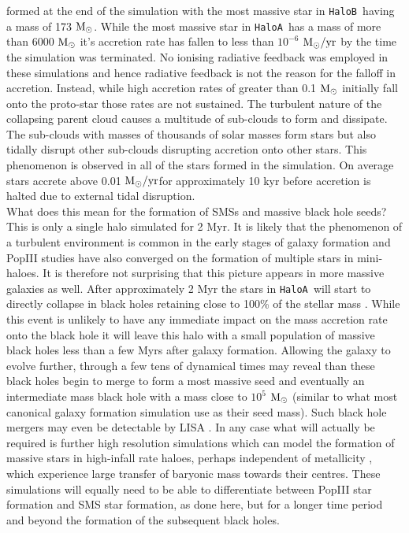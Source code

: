 \documentclass[graphics, twocolumn, usenatbib]{mn2e}
\newcommand{\msolar} {$\rm{M_{\odot}}~$}
\newcommand{\msolarc} {$\rm{M_{\odot}}$}
\newcommand{\msolaryr} {$\rm{M_{\odot}/yr}~$}
\newcommand{\msolaryrc} {$\rm{M_{\odot}/yr}$}
\newcommand{\ha} {\texttt{HaloA~}}
\newcommand{\hb} {\texttt{HaloB~}}
\begin{document}
formed at the end of the simulation with the most massive star in \hb having a mass of 173 \msolarc.
While the most massive star in \ha has a mass of more than 6000 \msolar it's accretion rate has fallen
to less than $10^{-6}$ \msolaryr by the time the simulation was terminated. No ionising radiative
feedback was employed in these simulations and hence radiative feedback is not the reason for
the falloff in accretion. Instead, while high accretion rates of greater than 0.1 \msolar initially
fall onto the proto-star those rates are not sustained. The turbulent nature of the collapsing parent
cloud causes a multitude of sub-clouds to form and dissipate. The sub-clouds with masses of
thousands of solar masses form stars but also tidally disrupt other sub-clouds disrupting
accretion onto other stars. This phenomenon is observed in all of the stars formed in the simulation.
On average stars accrete above 0.01 \msolaryrc for approximately 10 kyr before accretion is halted
due to external tidal disruption. \\
\indent What does this mean for the formation of SMSs and massive black hole seeds? This is only a
single halo simulated for 2 Myr. It is likely that the phenomenon of a turbulent environment is
common in the early stages of galaxy formation and PopIII studies have also converged on the
formation of multiple stars in mini-haloes. It is therefore not surprising that this picture appears in
more massive galaxies as well. After approximately 2 Myr the stars in \ha will start to directly
collapse in black holes retaining close to 100\% of the stellar mass \citep{Heger_2003}. While this
event is unlikely to have any immediate impact on the mass accretion rate onto the black hole it will
leave this halo with a small population of massive black holes less than a few Myrs after
galaxy formation. Allowing the galaxy to evolve further, through a few tens of dynamical times may
reveal than these black holes begin to merge to form a most massive seed and eventually an intermediate mass black hole with a mass close to $10^5$ \msolar (similar to what most canonical galaxy formation
simulation use as their seed mass). Such black hole mergers may even be
detectable by LISA \cite{Hartwig_2018}. In any case what will actually be required is further high
resolution simulations which can model the formation of massive stars in high-infall rate haloes,
perhaps independent of metallicity \citep[][Regan et al. 2020]{Chon_2020}, which experience
large transfer of baryonic mass towards their centres. These simulations will equally need to
be able to differentiate between PopIII star formation and SMS star formation, as done here, but
for a longer time period and beyond the formation of the subsequent black holes. 




\label{lastpage}


\end{document}
